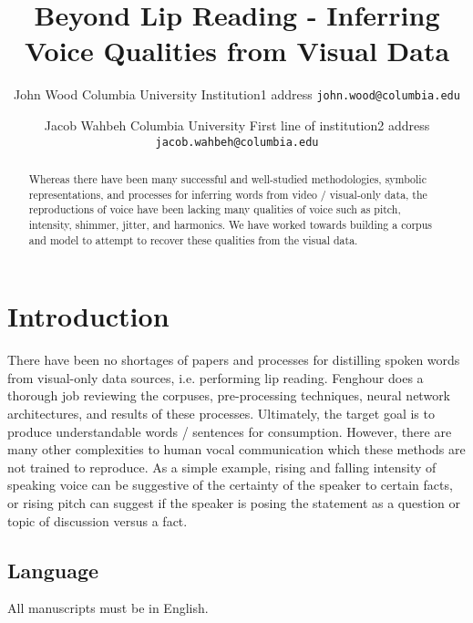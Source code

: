 \documentclass[10pt,twocolumn,letterpaper]{article}
\begin{document}
\title{Beyond Lip Reading - Inferring Voice Qualities from Visual Data}

\author{John Wood
Columbia University
Institution1 address
{\tt\small john.wood@columbia.edu}
\and Jacob Wahbeh
Columbia University
First line of institution2 address
{\tt\small jacob.wahbeh@columbia.edu}
}
\maketitle

\begin{abstract}
   Whereas there have been many successful and well-studied methodologies, symbolic representations, and processes for inferring words from video / visual-only data, the reproductions of voice have been lacking many qualities of voice such as pitch, intensity, shimmer, jitter, and harmonics. We have worked towards building a corpus and model to attempt to recover these qualities from the visual data.
\end{abstract}

\section{Introduction}
\label{sec:intro}

There have been no shortages of papers and processes for distilling spoken words from visual-only data sources, i.e. performing lip reading. Fenghour  \cite{Fenghour2021} does a thorough job reviewing the corpuses, pre-processing techniques, neural network architectures, and results of these processes. Ultimately, the target goal is to produce understandable words / sentences for consumption. However, there are many other complexities to human vocal communication which these methods are not trained to reproduce. As a simple example, rising and falling intensity of speaking voice can be suggestive of the certainty of the speaker to certain facts, or rising pitch can suggest if the speaker is posing the statement as a question or topic of discussion versus a fact. 

\subsection{Language}

All manuscripts must be in English.
\end{document}
